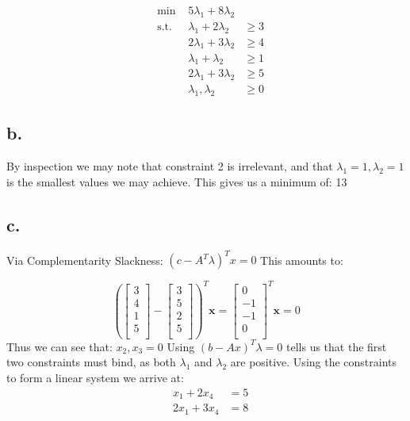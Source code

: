 \documentclass[10pt, letterpaper]{paper}
\begin{document}
\begin{equation*}
\begin{alignedat}{3}
&\text{min }&5\lambda_1 + 8\lambda_2&\\
&\text{s.t. } &\lambda_1 + 2\lambda_2 &\geq 3\\
& &2\lambda_1 + 3\lambda_2 &\geq 4\\
& &\lambda_1 + \lambda_2 &\geq 1\\
& &2\lambda_1 + 3\lambda_2 &\geq 5\\
& &\lambda_1, \lambda_2 &\geq 0
\end{alignedat}
\end{equation*}

\subsection*{b.}
By inspection we may note that constraint 2 is irrelevant, and that $\lambda_1 = 1, \lambda_2 = 1$ is the smallest values we may achieve. This gives us a minimum of: 13

\subsection*{c.}
Via Complementarity Slackness: $ (c- A^T \lambda )^T x = 0$ This amounts to: 

\[
	\left( \left[ {\begin{array}{c}
	3 \\
	4 \\
	1 \\
	5  \\
	\end{array} } \right] - \left[ {\begin{array}{c}
	3 \\
	5 \\
	2 \\
	5  \\
	\end{array} } \right] \right)^T \textbf{x}
    = 
    \left[ {\begin{array}{c}
	0 \\
	-1 \\
	-1 \\
	0  \\
	\end{array} } \right]^T \textbf{x} =
    0
\] 
Thus we can see that: $x_2, x_3 = 0$ Using $(b - Ax)^T \lambda = 0$ tells us that the first two constraints must bind, as both $\lambda_1$ and $\lambda_2$ are positive. Using the constraints to form a linear system we arrive at: 
\begin{equation*}
\begin{alignedat}{3}
& x_1 + 2x_4 &= 5 \\
& 2x_1 + 3x_4 &= 8\\
\end{alignedat}
\end{equation*}
\end{document}
